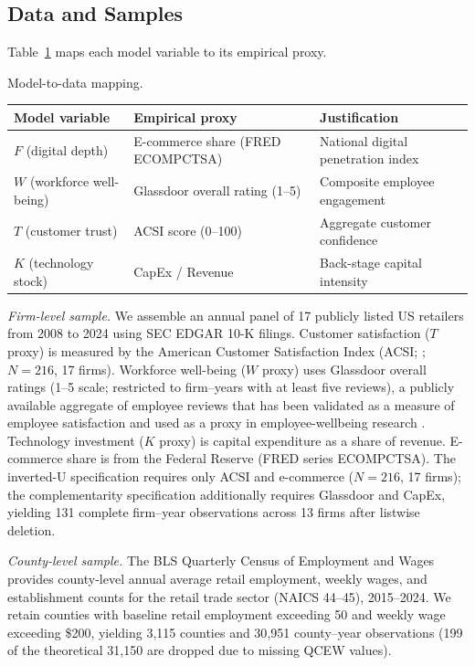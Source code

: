 \documentclass[msom,dblanonrev]{informs4}
\begin{document}
\subsection{Data and Samples}\label{sec:emp:data}

Table~\ref{tab:proxies} maps each model variable to its empirical proxy.

\begin{table}
\TABLE
{Model-to-data mapping.\label{tab:proxies}}
{{\setlength{\tabcolsep}{4pt}\small
\begin{tabular}{@{}lll@{}}
\toprule
\textbf{Model variable} & \textbf{Empirical proxy} & \textbf{Justification} \\
\midrule
$F$ (digital depth) & E-commerce share (FRED ECOMPCTSA) & National digital penetration index \\
$W$ (workforce well-being) & Glassdoor overall rating (1--5) & Composite employee engagement \\
$T$ (customer trust) & ACSI score (0--100) & Aggregate customer confidence \\
$K$ (technology stock) & CapEx / Revenue & Back-stage capital intensity \\
\bottomrule
\end{tabular}}}{}\end{table}

\textit{Firm-level sample.}
We assemble an annual panel of 17 publicly listed US retailers from 2008 to 2024 using SEC EDGAR 10-K filings. Customer satisfaction ($T$ proxy) is measured by the American Customer Satisfaction Index (ACSI; \citealp{fornell1996acsi}; $N = 216$, 17 firms). Workforce well-being ($W$ proxy) uses Glassdoor overall ratings (1--5 scale; restricted to firm--years with at least five reviews), a publicly available aggregate of employee reviews that has been validated as a measure of employee satisfaction and used as a proxy in employee-wellbeing research \citep{edmans2011does}. Technology investment ($K$ proxy) is capital expenditure as a share of revenue. E-commerce share is from the Federal Reserve (FRED series ECOMPCTSA). The inverted-U specification requires only ACSI and e-commerce ($N = 216$, 17 firms); the complementarity specification additionally requires Glassdoor and CapEx, yielding 131 complete firm--year observations across 13 firms after listwise deletion.

\textit{County-level sample.}
The BLS Quarterly Census of Employment and Wages provides county-level annual average retail employment, weekly wages, and establishment counts for the retail trade sector (NAICS 44--45), 2015--2024. We retain counties with baseline retail employment exceeding 50 and weekly wage exceeding \$200, yielding 3{,}115 counties and 30{,}951 county--year observations (199 of the theoretical 31{,}150 are dropped due to missing QCEW values).
\end{document}
